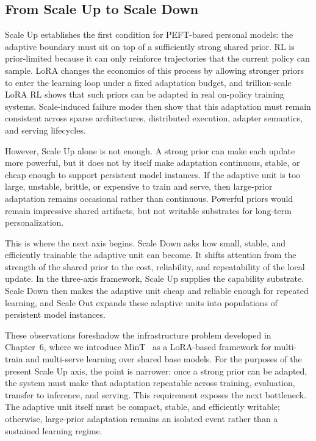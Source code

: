 \subsection{From Scale Up to Scale Down}\label{subsec:scale-up-to-down}

Scale Up establishes the first condition for PEFT-based personal models: the adaptive boundary must sit on top of a sufficiently strong shared prior. RL is prior-limited because it can only reinforce trajectories that the current policy can sample. LoRA changes the economics of this process by allowing stronger priors to enter the learning loop under a fixed adaptation budget, and trillion-scale LoRA RL shows that such priors can be adapted in real on-policy training systems. Scale-induced failure modes then show that this adaptation must remain consistent across sparse architectures, distributed execution, adapter semantics, and serving lifecycles.

However, Scale Up alone is not enough. A strong prior can make each update more powerful, but it does not by itself make adaptation continuous, stable, or cheap enough to support persistent model instances. If the adaptive unit is too large, unstable, brittle, or expensive to train and serve, then large-prior adaptation remains occasional rather than continuous. Powerful priors would remain impressive shared artifacts, but not writable substrates for long-term personalization.

This is where the next axis begins. Scale Down asks how small, stable, and efficiently trainable the adaptive unit can become. It shifts attention from the strength of the shared prior to the cost, reliability, and repeatability of the local update. In the three-axis framework, Scale Up supplies the capability substrate. Scale Down then makes the adaptive unit cheap and reliable enough for repeated learning, and Scale Out expands these adaptive units into populations of persistent model instances.

These observations foreshadow the infrastructure problem developed in Chapter~6, where we introduce MinT~\citep{mindlab2026mint} as a LoRA-based framework for multi-train and multi-serve learning over shared base models. For the purposes of the present Scale Up axis, the point is narrower: once a strong prior can be adapted, the system must make that adaptation repeatable across training, evaluation, transfer to inference, and serving. This requirement exposes the next bottleneck. The adaptive unit itself must be compact, stable, and efficiently writable; otherwise, large-prior adaptation remains an isolated event rather than a sustained learning regime.


